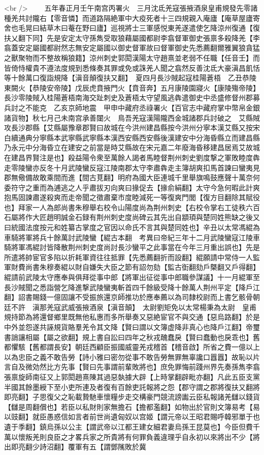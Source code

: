 <br />
　　五年春正月壬午南宫丙署火　三月沈氐羌寇張掖酒泉皇甫規發先零諸種羌共討隴右【零音憐】而道路隔絶軍中大疫死者十三四規親入庵廬【庵草屋廬寄舍也毛晃曰結草木曰菴在野曰廬】巡視將士三軍感悦東羌遂遣使乞降涼州復通【復扶乂翻下同】先是安定太守孫雋受取狼藉屬國都尉李翕督軍御史張禀多殺降羌【李翕蓋安定屬國都尉然志無安定屬國以御史督軍故曰督軍御史先悉薦翻爾雅翼狼貪猛之獸聚物而不整故稱狼籍】涼州刺史郭閎漢陽太守趙熹並老弱不任職【任音壬】而皆倚恃權貴不遵法度規到悉條奏其罪或免或誅羌人聞之翕然反善沈氐大豪滇昌飢恬等十餘萬口復詣規降【滇音顛復扶又翻】　夏四月長沙賊起寇桂陽蒼梧　乙丑恭陵東闕火【恭陵安帝陵】戊辰虎賁掖門火【賁音奔】五月康陵園寢火【康陵殤帝陵】　長沙零陵賊入桂陽蒼梧南海交趾刺史及蒼梧太守望風逃犇遣御史中丞盛修督州郡募兵討之不能克　乙亥京師地震　甲申中藏府丞祿署火【百官志中藏府掌中幣帛金銀諸貨物】秋七月己未南宫承善闥火　鳥吾羌寇漢陽隴西金城諸郡兵討破之　艾縣賊攻長沙郡縣【艾縣屬豫章郡賢曰故城在今洪州建昌縣按今洪州分寧本漢艾縣又按宋白續通典分寧縣本武寧縣武寧縣本漢西安縣西安縣後漢建安中分海昏縣立而建昌縣乃永元中分海昏立在建安之前當是時艾縣故在宋元嘉二年廢海昏移建昌居焉艾故城在建昌界賢注是也】殺益陽令衆至萬餘人謁者馬睦督荆州刺史劉度撃之軍敗睦度犇走零陵蠻亦反冬十月武陵蠻反寇江陵南郡太守李肅犇走主簿胡爽扣馬首諫曰蠻夷見郡無儆備故敢乘間而進【間古莧翻】明府為國大臣連城千里舉旗鳴鼓應聲十萬奈何委符守之重而為逋逃之人乎肅拔刃向爽曰掾促去【掾俞絹翻】太守今急何暇此計爽抱馬固諫肅遂殺爽而走帝聞之徵肅棄市度睦減死一等復爽門閭【復方目翻除其賦役也】拜家一人為郎尚書朱穆舉右校令山陽度尚為荆州刺史【右校令掌右工徒秩六百石屬將作大匠趙明誠金石録有荆州刺史度尚碑云其先出自顓頊與楚同姓熊缺之後又曰統國法度按元和姓纂古掌度之官因以命氏不言其與楚同姓也】辛丑以太常馮緄為車騎將軍將兵十餘萬討武陵蠻【緄古本翻　考異曰帝紀三年十二月武陵蠻寇江陵車騎將軍馮緄討皆降散荆州刺史度尚討長沙蠻平之此事當在今年三月重出誤也】先是所遣將帥宦官多陷以折耗軍資往往抵罪【先悉薦翻折而設翻】緄願請中常侍一人監軍財費尚書朱穆奏緄以財自嫌失大臣之節有詔勿劾【監古衘翻劾戶槩翻又戶得翻】緄請前武陵太守應奉與俱拜從事中郎【將軍出征從事中郎職參謀議】十一月緄軍至長沙賊聞之悉詣營乞降進撃武陵蠻夷斬首四千餘級受降十餘萬人荆州平定【降戶江翻】詔書賜錢一億固讓不受振旅還京師推功於應奉薦以為司隸校尉而上書乞骸骨朝廷不許　滇那羌寇武威張掖酒泉【滇音顛】　太尉劉矩免以太常楊秉為太尉　皇甫規持節為將還督鄉里既無他私惠而多所舉奏又惡絶宦官不與交通【惡烏路翻】於是中外並怨遂共誣規貨賂羣羌令其文降【賢曰謂以文簿虚降非真心也降戶江翻】帝璽書誚讓相屬【屬之欲翻】規上書自訟曰四年之秋戎醜蠢戾【賢曰蠢動也戾乖也】舊都懼駭【舊都謂長安】朝廷西顧臣振國威靈羌戎稽首【稽音啟】所省之費一億以上以為忠臣之義不敢告勞【詩小雅曰密勿從事不敢告勞無罪無辜讒口囂囂】故恥以片言自及微効然比方先事【賢曰先事謂前輩敗將也】庶免罪悔前踐州界先奏孫雋李翕張禀旋師南征又上郭閎趙熹陳其過惡埶據大辟【上時掌翻辟毗亦翻】凡此五臣支黨半國其餘墨綬下至小吏所連及者復有百餘吏託報將之怨【郡守謂之郡將復扶又翻將即亮翻】子思復父之恥載贄馳車懷糧步走交構豪門競流謗讟云臣私報諸羌讎以錢貨【讎是周翻償也】若臣以私財則家無擔石【擔都濫翻】如物出於官則文簿易考【易以豉翻】就臣愚惑信如言者前世尚遺匈奴以宫姬【謂元帝以王昭君賜呼韓邪單于也遺于季翻】鎮烏孫以公主【謂武帝以江都王建女細君妻烏孫王昆莫也】今臣但費千萬以懷叛羌則良臣之才畧兵家之所貴將有何罪負義違理乎自永初以來將出不少【將出即亮翻少詩沼翻】覆軍有五【謂鄧隲敗於冀